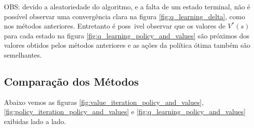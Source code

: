 OBS: devido a aleatoriedade do algoritmo, e a falta de um estado terminal, não é possível observar uma convergência clara na figura \ref{fig:q_learning_delta}, como nos métodos anteriores. Entretanto é poss~ivel observar que os valores de \( V^* (s) \) para cada estado na figura \ref{fig:q_learning_policy_and_values} são próximos dos valores obtidos pelos métodos anteriores e as ações da política ótima também são semelhantes.

\subsection*{Comparação dos Métodos}

Abaixo vemos as figuras \ref{fig:value_iteration_policy_and_values}, \ref{fig:policy_iteration_policy_and_values} e \ref{fig:q_learning_policy_and_values} exibidas lado a lado.

